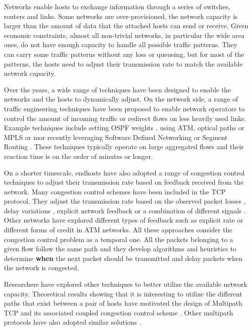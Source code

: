 Networks enable hosts to exchange information through a series of switches, routers and links. Some networks are over-provisioned, the network capacity is larger than the amount of data that the attached hosts can send or receive. Given economic constraints, almost all non-trivial networks, in particular the wide area ones, do not have enough capacity to handle all possible traffic patterns. They can carry some traffic patterns without any loss or queueing, but for most of the patterns, the hosts need to adjust their transmission rate to match the available network capacity.

Over the years, a wide range of techniques have been designed to enable the networks and the hosts to dynamically adjust. On the network side, a range of traffic engineering techniques have been proposed to enable network operators to control the amount of incoming traffic or redirect flows on less heavily used links. Example techniques include setting OSPF weights \cite{fortz2000internet}, using ATM, optical paths or MPLS \cite{awduche2002overview,xiao2000traffic} or mor recently leveraging Software Defined Networking \cite{jain2013b4} or Segment Routing \cite{filsfils2015segment}. These techniques typically operate on large aggregated flows and their reaction time is on the order of minutes or longer.

On a shorter timescale, endhosts have also adopted a range of congestion control techniques to adjust their transmission rate based on feedback received from the network. Many congestion control schemes have been included in the TCP protocol. They adjust the transmission rate based on the observed packet losses \cite{jacobson1988congestion,ha2008cubic}, delay variations \cite{brakmo1995tcp}, explicit network feedback \cite{ramakrishnan1999proposal} or a combination of different signals \cite{dong2015pcc,cardwell2017bbr}. Other networks have explored different types of feedback such as explicit rate \cite{kalyanaraman2000erica} or different forms of credit \cite{kung1995credit} in ATM networks. All these approaches consider the congestion control problem as a temporal one. All the packets belonging to a given flow follow the same path and they develop algorithms and heuristics to determine \textbf{when} the next packet should be transmitted and delay packets when the network is congested.

Researchers have explored other techniques to better utilize the available network capacity. Theoretical results showing that it is interesting to utilize the different paths that exist between a pair of hosts \cite{kelly2005stability,key2007multipath,wischik2008resource} have motivated the design of Multipath TCP \cite{raiciu2012hard} and its associated coupled congestion control scheme \cite{wischik2011design}. Other multipath protocols have also adopted similar solutions \cite{iyengar2006concurrent,de2017multipath}.

